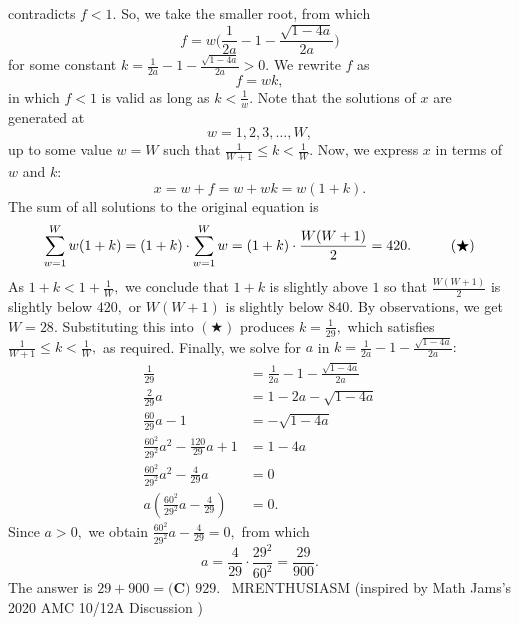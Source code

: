 \documentclass[12pt]{article}
\begin{document}
contradicts $f<1.$ So, we take the smaller root, from which \[f=w\Biggl(\frac{1}{2a}-1-\frac{\sqrt{1-4a}}{2a}\Biggr)\] for some constant $k=\frac{1}{2a}-1-\frac{\sqrt{1-4a}}{2a}>0.$ We rewrite $f$ as \[f=wk,\] in which $f<1$ is valid as long as $k<\frac 1w.$ Note that the solutions of $x$ are generated at \[w=1,2,3,\ldots,W,\] up to some value $w=W$ such that $\frac{1}{W+1}\leq k<\frac1W.$ Now, we express $x$ in terms of $w$ and $k:$ \[x=w+f=w+wk=w(1+k).\] The sum of all solutions to the original equation is \[\sum_{w=1}^{W}w(1+k)=(1+k)\cdot\sum_{w=1}^{W}w=(1+k)\cdot\frac{W(W+1)}{2}=420. \hspace{10mm}(\bigstar)\] As $1+k<1+\frac1W,$ we conclude that $1+k$ is slightly above $1$ so that $\frac{W(W+1)}{2}$ is slightly below $420,$ or $W(W+1)$ is slightly below $840.$ By observations, we get $W=28.$ Substituting this into $(\bigstar)$ produces $k=\frac{1}{29},$ which satisfies $\frac{1}{W+1}\leq k<\frac1W,$ as required. Finally, we solve for $a$ in $k=\frac{1}{2a}-1-\frac{\sqrt{1-4a}}{2a}:$ \begin{align*} \frac{1}{29}&=\frac{1}{2a}-1-\frac{\sqrt{1-4a}}{2a} \\ \frac{2}{29}a&=1-2a-\sqrt{1-4a} \\ \frac{60}{29}a-1&=-\sqrt{1-4a} \\ \frac{60^2}{29^2}a^2-\frac{120}{29}a+1&=1-4a \\ \frac{60^2}{29^2}a^2-\frac{4}{29}a&=0 \\ a\left(\frac{60^2}{29^2}a-\frac{4}{29}\right)&=0. \end{align*} Since $a>0,$ we obtain $\frac{60^2}{29^2}a-\frac{4}{29}=0,$ from which \[a=\frac{4}{29}\cdot\frac{29^2}{60^2}=\frac{29}{900}.\] The answer is $29+900=\boxed{\textbf{(C) } 929}.$ ~MRENTHUSIASM (inspired by Math Jams's 2020 AMC 10/12A Discussion )
\end{document}
